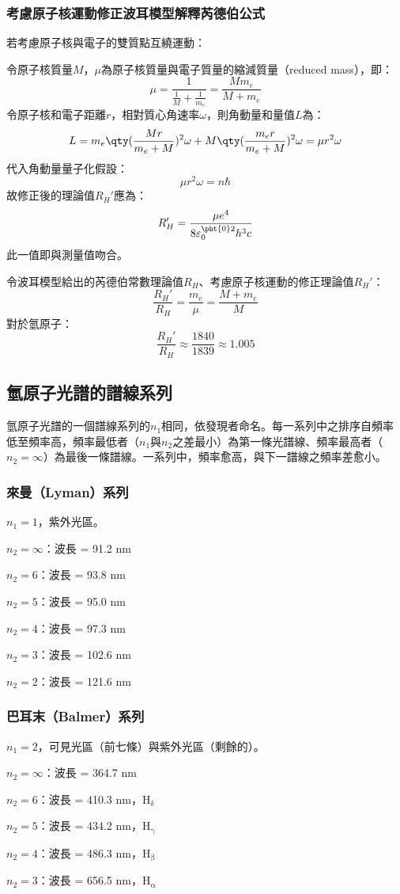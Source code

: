 \documentclass[a4paper,12pt]{report}
\begin{document}
\subsubsection{考慮原子核運動修正波耳模型解釋芮德伯公式}
若考慮原子核與電子的雙質點互繞運動：

令原子核質量$M$，$\mu$為原子核質量與電子質量的縮減質量（reduced mass），即：
\[\mu=\frac{1}{\frac{1}{M}+\frac{1}{m_e}}=\frac{Mm_e}{M+m_e}\]
令原子核和電子距離$r$，相對質心角速率$\omega$，則角動量和量值$L$為：
\[L=m_e\qty(\frac{Mr}{m_e+M})^2\omega+M\qty(\frac{m_er}{m_e+M})^2\omega=\mu r^2\omega\]
代入角動量量子化假設：
\[\mu r^2\omega=n\hbar\]
故修正後的理論值$R_H'$應為：
\[R_H'=\frac{\mu e^4}{8\varepsilon_0^{\pht{0}2}h^3c}\]
此一值即與測量值吻合。

令波耳模型給出的芮德伯常數理論值$R_H$、考慮原子核運動的修正理論值$R_H'$：
\[\frac{R_H'}{R_H}=\frac{m_e}{\mu}=\frac{M+m_e}{M}\]
對於氫原子：
\[\frac{R_H'}{R_H}\approx\frac{1840}{1839}\approx1.005\]
\subsection{氫原子光譜的譜線系列}
氫原子光譜的一個譜線系列的$n_1$相同，依發現者命名。每一系列中之排序自頻率低至頻率高，頻率最低者（$n_1$與$n_2$之差最小）為第一條光譜線、頻率最高者（$n_2 = \infty$）為最後一條譜線。一系列中，頻率愈高，與下一譜線之頻率差愈小。
\subsubsection{來曼（Lyman）系列}
$n_1 = 1$，紫外光區。
\bit
\item $n_2=\infty$：波長 = 91.2 nm
\item $n_2=6$：波長 = 93.8 nm
\item $n_2=5$：波長 = 95.0 nm
\item $n_2=4$：波長 = 97.3 nm
\item $n_2=3$：波長 = 102.6 nm
\item $n_2=2$：波長 = 121.6 nm
\eit
\subsubsection{巴耳末（Balmer）系列}
$n_1 = 2$，可見光區（前七條）與紫外光區（剩餘的）。
\bit
\item $n_2=\infty$：波長 = 364.7 nm
\item $n_2=6$：波長 = 410.3 nm，H$_\text{δ}$
\item $n_2=5$：波長 = 434.2 nm，H$_\text{γ}$
\item $n_2=4$：波長 = 486.3 nm，H$_\text{β}$
\item $n_2=3$：波長 = 656.5 nm，H$_\text{α}$
\eit
\end{document}

